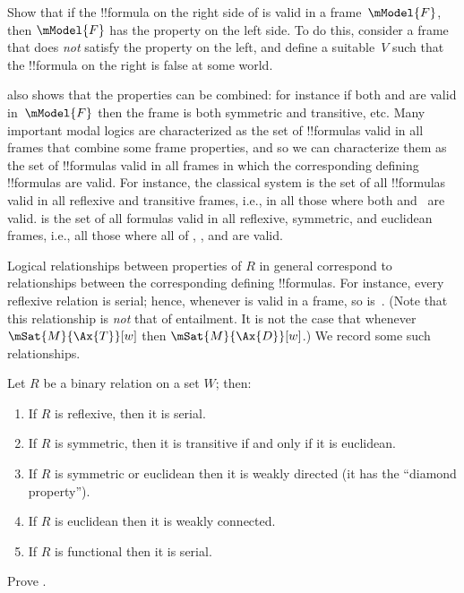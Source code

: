 \documentclass[../../../include/open-logic-section]{subfiles}
\begin{document}
\begin{prob}
Show that if the !!{formula} on the right side of
 is valid in a frame~$\mModel{F}$, then
$\mModel{F}$ has the property on the left side. To do this, consider a
frame that does \emph{not} satisfy the property on the left, and
define a suitable~$V$ such that the !!{formula} on the right is false
at some world.
\end{prob}

 also shows that the properties can be
combined: for instance if both  and  are valid
in~$\mModel{F}$ then the frame is both symmetric and transitive,
etc. Many important modal logics are characterized as the set of
!!{formula}s valid in all frames that combine some frame properties,
and so we can characterize them as the set of !!{formula}s valid in
all frames in which the corresponding defining !!{formula}s are valid.
For instance, the classical system  is the set of all
!!{formula}s valid in all reflexive and transitive frames, i.e., in
all those where both  and~ are valid.   is the set
of all formulas valid in all reflexive, symmetric, and euclidean
frames, i.e., all those where all of , , and  are
valid.

Logical relationships between properties of $R$ in general correspond
to relationships between the corresponding defining !!{formula}s. For
instance, every reflexive relation is serial; hence, whenever 
is valid in a frame, so is~. (Note that this relationship is
\emph{not} that of entailment. It is not the case that whenever
$\mSat{M}{\Ax{T}}[w]$ then $\mSat{M}{\Ax{D}}[w]$.) We record some such
relationships.

\begin{prop}
  Let $R$ be a binary relation on a set $W$; then:
  \begin{enumerate}
  \item If $R$ is reflexive, then it is serial.
  \item If $R$ is symmetric, then it is transitive if and only if it
    is euclidean.
  \item If $R$ is symmetric or euclidean then it is weakly directed
    (it has the ``diamond property'').
  \item If $R$ is euclidean then it is weakly connected.
  \item If $R$ is functional then it is serial.  
  \end{enumerate}
\end{prop}

\begin{prob}
  Prove .
\end{prob}
\end{document}
